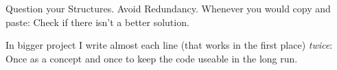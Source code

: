 
\begin{frame}
%
\begin{hintbox}[Conclusion]
Question your Structures. Avoid Redundancy. Whenever you would copy and paste: Check if there isn't a better solution.

In bigger project I write almost each line (that works in the first place) \emph{twice}: Once as a concept and once to keep the code useable in the long run.
\end{hintbox}
%
\end{frame}